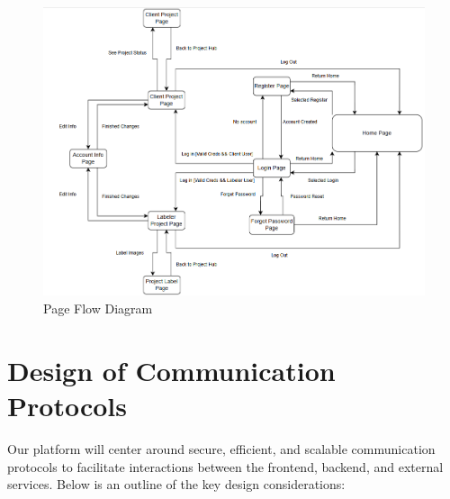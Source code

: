 \documentclass[12pt, titlepage]{article}
\begin{document}
\begin{figure}[H]
    \centering
    \includegraphics[width=\linewidth]{UI_flow.png}
    \caption{Page Flow Diagram}
\end{figure}

\section{Design of Communication Protocols}


Our platform will center around secure, efficient, and scalable communication protocols to facilitate interactions between the frontend, backend, and external services. Below is an outline of the key design considerations:
\end{document}
